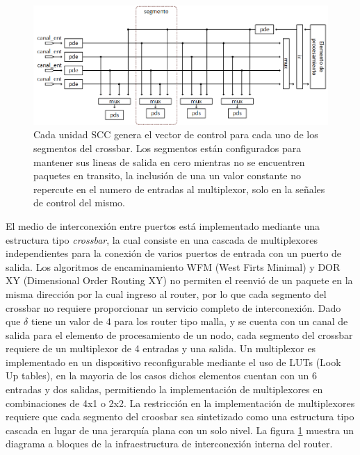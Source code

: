 \begin{figure}
	\begin{center}
		\includegraphics[scale=0.7]{figures/ch4_crossbar.png}
	\end{center}
	\caption
		{	
			Cada unidad SCC genera el vector de control para cada uno de los segmentos del crossbar. Los segmentos están configurados para mantener sus lineas de salida en cero mientras no se encuentren paquetes en transito, la inclusión de una un valor constante no repercute en el numero de entradas al multiplexor, solo en la señales de control del mismo.
		}
	\label{fig:ch4_crossbar}
\end{figure}

El medio de interconexión entre puertos está implementado mediante una estructura tipo \textit{crossbar}, la cual  consiste en una cascada de multiplexores independientes para la conexión de varios puertos de entrada con un puerto de salida. Los algoritmos de encaminamiento WFM (West Firts Minimal) y DOR XY (Dimensional Order Routing XY) no permiten el reenvió de un paquete en la misma dirección por la cual ingreso al router,  por lo que cada segmento del crossbar no requiere proporcionar un servicio completo de interconexión. Dado que $\delta$  tiene un valor de 4 para los router tipo malla, y se cuenta con un canal de salida para el elemento de procesamiento de un nodo, cada segmento del crossbar requiere de un multiplexor de 4 entradas y una salida. Un multiplexor es implementado en un dispositivo reconfigurable mediante el uso de LUTs (Look Up tables),  en la mayoria de los casos dichos elementos cuentan con un 6 entradas y dos salidas, permitiendo la implementación de multiplexores en combinaciones de 4x1 o 2x2. La restricción en la implementación de multiplexores requiere que cada segmento del croosbar sea sintetizado como una estructura tipo cascada en lugar de una jerarquía plana con un solo nivel. La figura \ref{fig:ch4_crossbar} muestra un diagrama a bloques de la infraestructura de interconexión interna del router. 










